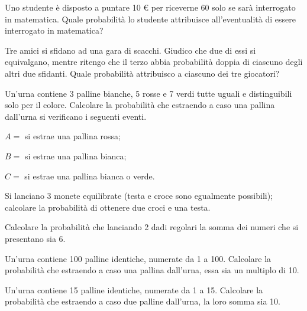 \begin{esercizio}[\Ast]
 \label{ese:9.8}
Uno studente è disposto a puntare 10 € per riceverne 60 solo se sarà interrogato in matematica. Quale probabilità lo studente attribuisce all'eventualità di essere interrogato in matematica?
\end{esercizio}

\begin{esercizio}[\Ast]
 \label{ese:9.9}
Tre amici si sfidano ad una gara di scacchi. Giudico che due di essi si equivalgano, mentre ritengo che il terzo abbia probabilità doppia di ciascuno degli altri due sfidanti. Quale probabilità attribuisco a ciascuno dei tre giocatori?
\end{esercizio}

\begin{esercizio}[\Ast]
 \label{ese:9.10}
Un'urna contiene 3 palline bianche, 5 rosse e 7 verdi tutte uguali e distinguibili solo per il colore. Calcolare la probabilità che estraendo a caso una pallina dall'urna si verificano i seguenti eventi.
\begin{description*}
\item $ A= $ si estrae una pallina rossa;
\item $ B= $ si estrae una pallina bianca;
\item $ C= $ si estrae una pallina bianca o verde.
\end{description*}
\end{esercizio}

\begin{esercizio}
 \label{ese:9.11}
Si lanciano 3 monete equilibrate (testa e croce sono egualmente possibili); calcolare la probabilità di ottenere due croci e una testa.
\end{esercizio}

\begin{esercizio}[\Ast]
 \label{ese:9.12}
Calcolare la probabilità che lanciando 2 dadi regolari la somma dei numeri che si presentano sia 6.
\end{esercizio}

\begin{esercizio}[\Ast]
 \label{ese:9.13}
Un'urna contiene 100 palline identiche, numerate da 1 a 100. Calcolare la probabilità che estraendo a caso una pallina dall'urna, essa sia un multiplo di 10.
\end{esercizio}

\begin{esercizio}[\Ast]
 \label{ese:9.14}
Un'urna contiene 15 palline identiche, numerate da 1 a 15. Calcolare la probabilità che estraendo a caso due palline dall'urna, la loro somma sia 10.
\end{esercizio}

